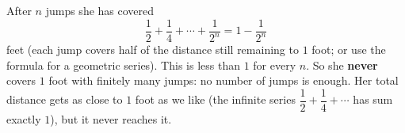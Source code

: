 After $n$ jumps she has covered
\[\dfrac12+\dfrac14+\cdots+\dfrac1{2^n}=1-\dfrac1{2^n}\]
feet (each jump covers half of the distance still remaining to $1$ foot; or use the formula for a geometric series). This is less than $1$ for every $n$. So she \textbf{never} covers $1$ foot with finitely many jumps: no number of jumps is enough. Her total distance gets as close to $1$ foot as we like (the infinite series $\dfrac12+\dfrac14+\cdots$ has sum exactly $1$), but it never reaches it.
